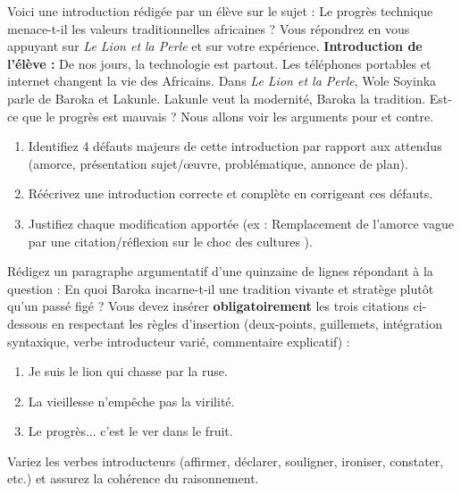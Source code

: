 \documentclass[11pt]{article}
\begin{document}
\begin{exercice}
Voici une introduction rédigée par un élève sur le sujet : \og Le progrès technique menace-t-il les valeurs traditionnelles africaines ? Vous répondrez en vous appuyant sur \emph{Le Lion et la Perle} et sur votre expérience. \fg
\textbf{Introduction de l'élève :}
\og De nos jours, la technologie est partout. Les téléphones portables et internet changent la vie des Africains. Dans \emph{Le Lion et la Perle}, Wole Soyinka parle de Baroka et Lakunle. Lakunle veut la modernité, Baroka la tradition. Est-ce que le progrès est mauvais ? Nous allons voir les arguments pour et contre. \fg
\begin{enumerate}
\item Identifiez 4 défauts majeurs de cette introduction par rapport aux attendus (amorce, présentation sujet/œuvre, problématique, annonce de plan).
\item Réécrivez une introduction correcte et complète en corrigeant ces défauts.
\item Justifiez chaque modification apportée (ex : \og Remplacement de l'amorce vague par une citation/réflexion sur le choc des cultures \fg).
\end{enumerate}
\end{exercice}

\begin{exercice}
Rédigez un paragraphe argumentatif d'une quinzaine de lignes répondant à la question : \og En quoi Baroka incarne-t-il une tradition vivante et stratège plutôt qu'un passé figé ? \fg
Vous devez insérer \textbf{obligatoirement} les trois citations ci-dessous en respectant les règles d'insertion (deux-points, guillemets, intégration syntaxique, verbe introducteur varié, commentaire explicatif) :
\begin{enumerate}
\item \og Je suis le lion qui chasse par la ruse. \fg
\item \og La vieillesse n'empêche pas la virilité. \fg
\item \og Le progrès... c'est le ver dans le fruit. \fg
\end{enumerate}
Variez les verbes introducteurs (affirmer, déclarer, souligner, ironiser, constater, etc.) et assurez la cohérence du raisonnement.
\end{exercice}
\end{document}
